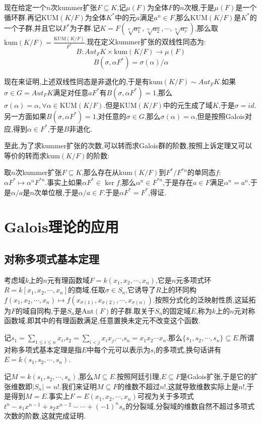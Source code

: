 现在给定一个$n$次kummer扩张$F\subseteq K$,记$\mu(F)$为全体$F$的$n$次根,于是$\mu(F)$是一个循环群.再记$\mathrm{KUM}(K/F)$为全体$K^*$中的元$a$满足$a^n\in F$,那么$\mathrm{KUM}(K/F)$是$K^*$的一个子群,并且它以$F^*$为子群.记$K=F(\sqrt[n]{a_1},\sqrt[n]{a_2},\cdots,\sqrt[n]{a_r})$,那么取$\mathrm{kum}(K/F)=\frac{\mathrm{KUM}(K/F)}{F^*}$.现在定义kummer扩张的双线性同态为:
$$B:Aut_FK\times\mathrm{kum}(K/F)\to\mu(F)$$
$$B(\sigma,\alpha F^*)=\sigma(\alpha)/\alpha$$

现在来证明,上述双线性同态是非退化的,于是有$\mathrm{kum}(K/F)\sim Aut_FK$.如果$\sigma\in G=Aut_FK$满足对任意$aF^*$有$B(\sigma,\alpha F^*)=1$,那么$\sigma(\alpha)=\alpha,\forall \alpha\in \mathrm{KUM}(K/F)$.但是$\mathrm{KUM}(K/F)$中的元生成了域$K$,于是$\sigma=id$.另一方面如果$B(\sigma,\alpha F^*)=1$,对任意的$\sigma\in G$,那么$\sigma(\alpha)=\alpha$,但是按照Galois对应,得到$\alpha\in F^*$,于是$B$非退化.

至此,为了求kummer扩张的次数,可以转而求Galois群的阶数,按照上诉定理又可以等价的转而求$\mathrm{kum}(K/F)$的阶数:

取$n$次kummer扩张$F\subseteq K$,那么存在从$\mathrm{kum}(K/F)$到$F^*/F^ {*n}$的单同态$f$:$\alpha F^*\mapsto \alpha^nF^{*n}$.事实上如果$\alpha F^*\in\ker f$,那么$\alpha^n\in F^{*n}$,于是存在$a\in F$满足$\alpha^n=a^n$.于是$\alpha/a$是$n$次单位根,于是$\alpha/a\in F$.于是$\alpha F^*=F^*$,得证.
\newpage
\section{Galois理论的应用}
\subsection{对称多项式基本定理}

考虑域$k$上的$n$元有理函数域$F=k(x_1,x_2,\cdots,x_n)$,它是$n$元多项式环$R=k[x_1,x_2,\cdots,x_n]$的商域.任取$\sigma\in S_n$,它诱导了$R$上的环同构$f(x_1,x_2,\cdots,x_n)\mapsto f(x_{\sigma(1)},x_{\sigma(2)},\cdots,x_{\sigma(n)})$.按照分式化的泛映射性质,这延拓为$F$的域自同构,于是$S_n$是$\mathrm{Ant}(F)$的子群.取关于$S_n$的固定域$E$,称为$k$上的$n$元对称函数域.即其中的有理函数满足,任意置换未定元不改变这个函数.

记$s_1=\sum_{1\le i\le n}x_i$,$s_2=\sum_{i<j}x_ix_j$,$\cdots$,$s_n=x_1x_2\cdots x_n$.那么$\{s_1,s_2,\cdots,s_n\}\subseteq E$.所谓对称多项式基本定理是指$E$中每个元可以表示为$s_i$的多项式,换句话讲有$E=k(s_1,s_2,\cdots,s_n)$.

记$M=k(s_1,s_2,\cdots,s_n)$,那么$M\subseteq E$.按照阿廷引理,$E\subseteq F$是Galois扩张,于是它的扩张维数即$|S_n|=n!$.我们来证明$M\subseteq F$的维数不超过$n!$,这就导致维数实际上是$n!$,于是得到$M=E$.事实上$F=E(x_1,x_2,\cdots,x_n)$可视为关于多项式$t^n-s_1x^{n-1}+s_2x^{n-2}-\cdots+(-1)^ns_n$的分裂域,分裂域的维数自然不超过多项式次数的阶数,这就完成证明.
\newpage
